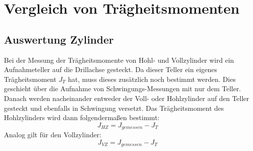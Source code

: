 \documentclass[12pt,a4paper]{article}
\begin{document}
\section{Vergleich von Trägheitsmomenten}

\subsection{Auswertung Zylinder}
Bei der Messung der Trägheitsmomente von Hohl- und Vollzylinder wird ein Aufnahmeteller auf die Drillachse gesteckt. Da dieser Teller ein eigenes Trägheitsmoment $J_T$ hat, muss dieses zusätzlich noch bestimmt werden. Dies geschieht über die Aufnahme von Schwingungs-Messungen mit nur dem Teller. Danach werden nacheinander entweder der Voll- oder Hohlzylinder auf den Teller gesteckt und ebenfalls in Schwingung versetzt. Das Trägheitsmoment des Hohlzylinders wird dann folgendermaßen bestimmt:
\begin{equation}
J_{HZ} = J_{gemessen}-J_T
\end{equation}
Analog gilt für den Vollzylinder:
\begin{equation}
J_{VZ} = J_{gemessen}-J_T
\end{equation}
\end{document}
